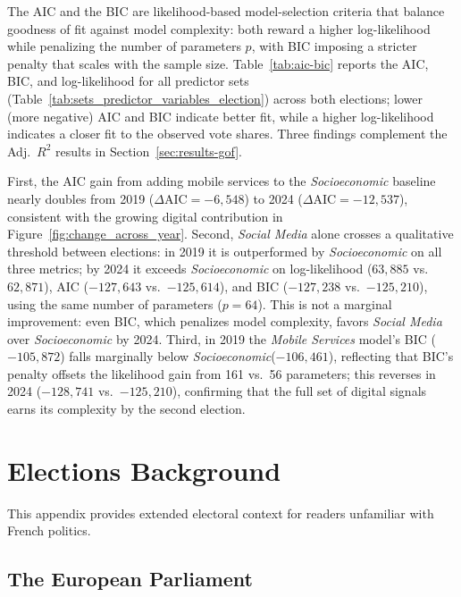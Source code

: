 \documentclass[9pt,sigconf,letterpaper]{acmart}
\newcommand{\socioeconomic}{\emph{Socioeconomic}\xspace}
\newcommand{\socialmedia}{\emph{Social Media}\xspace}
\newcommand{\mobile}{\emph{Mobile Services}\xspace}
\newcommand{\adjrsquare}{Adj.~$R^2$\xspace}
\begin{document}
The \acf{AIC} and the \acf{BIC} are likelihood-based model-selection criteria that balance goodness of fit against model complexity: both reward a higher log-likelihood while penalizing the number of parameters $p$, with \ac{BIC} imposing a stricter penalty that scales with the sample size.
Table~\ref{tab:aic-bic} reports the \ac{AIC}, \ac{BIC}, and log-likelihood for all predictor sets (Table~\ref{tab:sets_predictor_variables_election}) across both elections; lower (more negative) \ac{AIC} and \ac{BIC} indicate better fit, while a higher log-likelihood indicates a closer fit to the observed vote shares.
Three findings complement the \adjrsquare results in Section~\ref{sec:results-gof}.

First, the AIC gain from adding mobile services to the \socioeconomic baseline nearly doubles from 2019 ($\Delta\text{AIC} = {-6{,}548}$) to 2024 ($\Delta\text{AIC} = {-12{,}537}$), consistent with the growing digital contribution in Figure~\ref{fig:change_across_year}.
Second, \socialmedia alone crosses a qualitative threshold between elections: in 2019 it is outperformed by \socioeconomic on all three metrics; by 2024 it exceeds \socioeconomic on log-likelihood ($63{,}885$ vs.\ $62{,}871$), AIC ($-127{,}643$ vs.\ $-125{,}614$), and BIC ($-127{,}238$ vs.\ $-125{,}210$), using the same number of parameters ($p=64$).
This is not a marginal improvement: even BIC, which penalizes model complexity, favors \socialmedia over \socioeconomic by 2024.
Third, in 2019 the \mobile model's \ac{BIC} ($-105{,}872$) falls marginally below \socioeconomic ($-106{,}461$), reflecting that \ac{BIC}'s penalty offsets the likelihood gain from 161 vs.\ 56 parameters; this reverses in 2024 ($-128{,}741$ vs.\ $-125{,}210$), confirming that the full set of digital signals earns its complexity by the second election.

\section{Elections Background}
\label{app:elections}

This appendix provides extended electoral context for readers unfamiliar with French politics.

\subsection*{The European Parliament}
\end{document}
